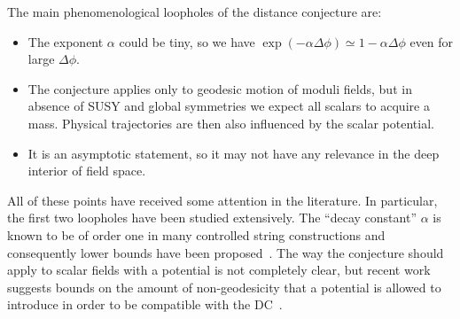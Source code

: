 \documentclass[11pt,a4paper]{article}
\numberwithin{equation}{section}
\numberwithin{table}{section}\setlength{\multlinegap}{25pt}
\begin{document}
The main phenomenological loopholes of the distance conjecture are:
\begin{itemize}
    \item The exponent $\alpha$ could be tiny, so we have $\exp(-\alpha\Delta\phi)\simeq 1-\alpha\Delta\phi$ even for large $\Delta\phi$.
    \item The conjecture applies only to geodesic motion of moduli fields, but in absence of SUSY and global symmetries we expect all scalars to acquire a mass. Physical trajectories are then also influenced by the scalar potential.
    \item It is an asymptotic statement, so it may not have any relevance in the deep interior of field space.
\end{itemize}

All of these points have received some attention in the literature. In particular, the first two loopholes have been studied extensively. The ``decay constant'' $\alpha$ is known to be of order one in many controlled string constructions and consequently lower bounds have been proposed~\cite{Klaewer:2016kiy,Lanza:2020qmt,Lanza:2021qsu,Grimm:2018ohb,Blumenhagen:2018nts,Erkinger:2019umg,Joshi:2019nzi,Bedroya:2019snp,EnriquezRojo:2020hzi,Andriot:2020lea,Baume:2020dqd,Perlmutter:2020buo}. The way the conjecture should apply to scalar fields with a potential is not completely clear, but recent work suggests bounds on the amount of non-geodesicity that a potential is allowed to introduce in order to be compatible with the DC~\cite{Calderon-Infante:2020dhm}.
\end{document}
